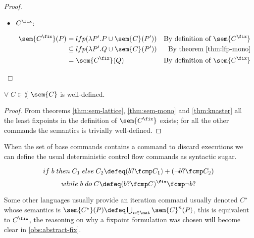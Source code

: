 \begin{definition}
\begin{proof}
\begin{itemize}
      \item $C^\fix$:

        \begin{align*}
          \sem{C^\fix}(P) 
            &= lfp(\lambda P'. P \cup \sem{C}(P'))
            &\text{By definition of $\sem{C^\fix}$}\\
            &\subseteq lfp(\lambda P'. Q \cup \sem{C}(P'))
            &\text{By theorem \ref{thm:lfp-mono}}\\
            &= \sem{C^\fix}(Q) 
            &\text{By definition of $\sem{C^\fix}$}\\
        \end{align*}

    \end{itemize}

  \end{proof}

  \begin{lemma}
    $\forall \; C \in \lang$ $\sem{C}$ is well-defined.
  \end{lemma}
  \begin{proof}
    From theorems \ref{thm:sem-lattice}, \ref{thm:sem-mono} and 
    \ref{thm:knaster} all the least fixpoints in the definition of 
    $\sem{C^\fix}$ exists; for all the other commands the semantics is 
    trivially well-defined.
  \end{proof}

  \begin{observation}
    When the set of base commands contains a command to discard executions we
    can define the usual deterministic control flow commands as syntactic sugar.

    $$if \; b \; then \; C_1 \; else \; C_2 \defeq (b ? \fcmp C_1) 
    + (\neg b ? \fcmp C_2)$$
    $$while \; b \; do \; C \defeq (b? \fcmp C)^\fix \fcmp \neg b ?$$
  \end{observation}

  \begin{observation}
    Some other languages usually provide an iteration command usually denoted
    $C^\star$ whose semantics is $\sem{C^\star}(P) \defeq \bigcup_{n \in \nat}
    \sem{C}^n(P)$, this is equivalent to $C^\fix$, the reasoning on why a
    fixpoint formulation was chosen will become clear in 
    \ref{obs:abstract-fix}.
  \end{observation}

\end{definition}
